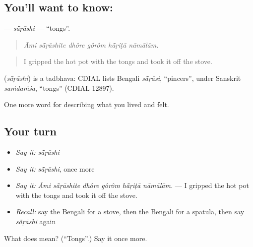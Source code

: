 \subsection*{You'll want to know: }
\textbf{} — \emph{sā̃ṛāshi} — \textquotedblleft{}tongs\textquotedblright{}.

\begin{quote}
     
\end{quote}

\begin{quote}
\emph{Āmi sā̃ṛāshite dhôre gôrôm hā̃ṛiṭā nāmālām.}
\end{quote}

\begin{quote}
I gripped the hot pot with the tongs and took it off the stove.
\end{quote}

\begin{cousinweb}
\textbf{} (\emph{sā̃ṛāshi}) is a tadbhava: CDIAL lists Bengali \emph{sā̃ṛāsi}, \textquotedblleft{}pincers\textquotedblright{}, under Sanskrit \emph{saṁdaṁśa}, \textquotedblleft{}tongs\textquotedblright{} (CDIAL 12897).
\end{cousinweb}

\begin{grammarlens}[title={What you've built}]
One more word for describing what you lived and felt.
\end{grammarlens}

\subsection*{Your turn}
\begin{itemize}
\raggedright
  \item \emph{Say it:} \emph{sā̃ṛāshi}
  \item \emph{Say it:} \emph{sā̃ṛāshi}, once more
  \item \emph{Say it:} \emph{Āmi sā̃ṛāshite dhôre gôrôm hā̃ṛiṭā nāmālām.} — I gripped the hot pot with the tongs and took it off the stove.
  \item \emph{Recall:} say the Bengali for a stove, then the Bengali for a spatula, then say \emph{sā̃ṛāshi} again
\end{itemize}

\begin{tcolorbox}[breakable,colback=teal!4,colframe=teal!35!black,title={Before you move on}]
What does  mean? (\textquotedblleft{}Tongs\textquotedblright{}.) Say it once more.
\end{tcolorbox}
